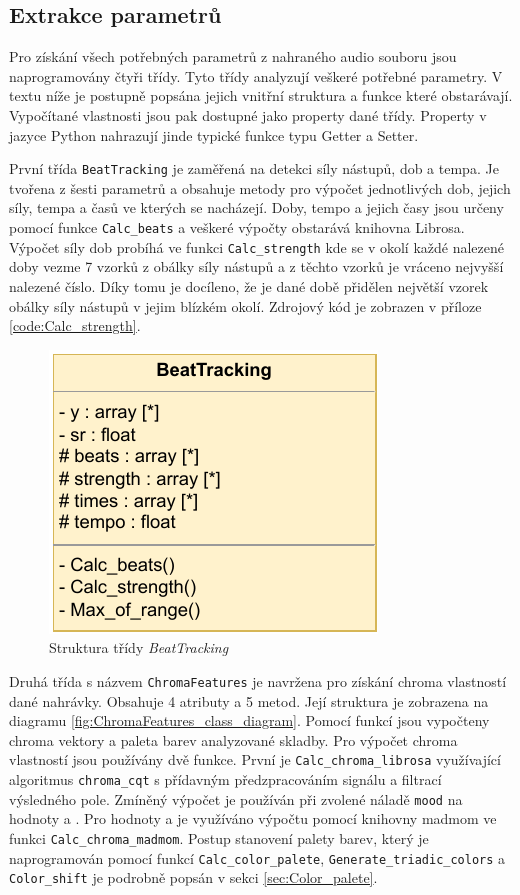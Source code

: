 \subsection{Extrakce parametrů} \label{sec:Parameter_extraction}
Pro získání všech potřebných parametrů z nahraného audio souboru jsou naprogramovány čtyři třídy. Tyto třídy analyzují veškeré potřebné parametry. V textu níže je postupně popsána jejich vnitřní struktura a funkce které obstarávají. Vypočítané vlastnosti jsou pak dostupné jako property dané třídy. Property v jazyce Python nahrazují jinde typické funkce typu Getter a Setter.

První třída \texttt{BeatTracking} je zaměřená na detekci síly nástupů, dob a tempa. Je tvořena z šesti parametrů a obsahuje metody pro výpočet jednotlivých dob, jejich síly, tempa a časů ve kterých se nacházejí. Doby, tempo a jejich časy jsou určeny pomocí funkce \texttt{Calc\_beats} a veškeré výpočty obstarává knihovna Librosa. Výpočet síly dob probíhá ve funkci \texttt{Calc\_strength} kde se v okolí každé nalezené doby vezme 7 vzorků z obálky síly nástupů a z těchto vzorků je vráceno nejvyšší nalezené číslo. Díky tomu je docíleno, že je dané době přidělen největší vzorek obálky síly nástupů v jejim blízkém okolí. Zdrojový kód je zobrazen v příloze \ref{code:Calc_strength}.

\begin{figure}[H]
    \centering
        \includegraphics[width = 0.3\linewidth]{obrazky/UML_diagramy_BeatTracking.pdf}
        \caption{Struktura třídy \textit{BeatTracking}}
        \label{fig:BeatTracking_class_diagram}
\end{figure}

Druhá třída s názvem \texttt{ChromaFeatures} je navržena pro získání chroma vlastností dané nahrávky. Obsahuje 4 atributy a 5 metod. Její struktura je zobrazena na diagramu \ref{fig:ChromaFeatures_class_diagram}. Pomocí funkcí jsou vypočteny chroma vektory a paleta barev analyzované skladby. Pro výpočet chroma vlastností jsou používány dvě funkce. První je \texttt{Calc\_chroma\_librosa} využívající algoritmus \texttt{chroma\_cqt} s přídavným předzpracováním signálu a filtrací výsledného pole. Zmíněný výpočet je používán při zvolené náladě \texttt{mood} na hodnoty  a . Pro hodnoty  a  je využíváno výpočtu pomocí knihovny madmom ve funkci \texttt{Calc\_chroma\_madmom}. Postup stanovení palety barev, který je naprogramován pomocí funkcí \texttt{Calc\_color\_palete}, \texttt{Generate\_triadic\_colors} a \texttt{Color\_shift} je podrobně popsán v sekci \ref{sec:Color_palete}.

